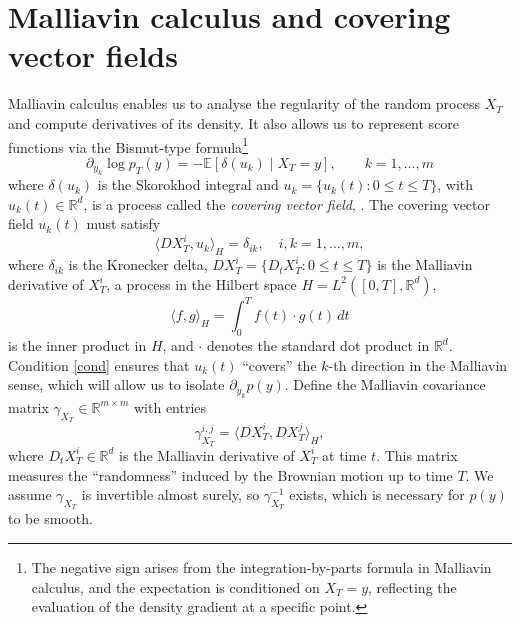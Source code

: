 \documentclass[]{interact}
\newcommand{\E}{\mathbb{E}}
\newcommand{\R}{\mathbb{R}}
\newcommand{\1}{\mathbf{1}}
\theoremstyle{plain}%
\theoremstyle{definition}
\theoremstyle{remark}
\numberwithin{equation}{section}
\begin{document}
\section{Malliavin calculus and covering vector fields}
\label{sec:malliavin}
Malliavin calculus enables us to analyse the regularity of the random process \(X_T\) and compute derivatives of its density. It also allows us to represent score functions via the Bismut-type formula\footnote{The negative sign arises from the integration-by-parts formula in Malliavin calculus, and the expectation is conditioned on \(X_T = y\), reflecting the evaluation of the density gradient at a specific point.}
%
\begin{equation}
\partial_{y_k} \log p_T(y) = -\E \left[ \delta(u_k) \mid X_T = y \right],\qquad k=1,\ldots, m
\end{equation}
where \(\delta(u_k)\) is the Skorokhod integral and \(u_k = \{ u_k(t) : 0 \leq t \leq T \}\), with \(u_k(t) \in \R^d\), 
is a process called the {\em covering vector field}, \cite{malliavin.thalmaier:06:stochastic, Nualart_Nualart_2018}. 
%
The covering vector field  \(u_k(t)\) must satisfy
\begin{equation}
\langle D X_T^i, u_k \rangle_H = \delta_{ik}, \quad i, k = 1, \ldots, m,
\label{cond}
\end{equation}
where  \(\delta_{ik} \) is the Kronecker delta, \(D X_T^i = \{ D_t X_T^i : 0 \leq t \leq T \}\) is the Malliavin derivative of \(X_T^i\), a process in the Hilbert space \(H = L^2\left([0, T], \R^d\right)\), 
\begin{equation*}
\langle f, g \rangle_H = \int_0^T f(t) \cdot g(t) \, dt
\end{equation*}
 is the inner product in \(H\), and \(\cdot\) denotes the standard dot product in \(\R^d\).
%
%
Condition \eqref{cond} ensures that \(u_k(t)\) ``covers'' the \(k\)-th direction 
in the Malliavin sense, which will allow us to isolate \(\partial_{y_k} p(y)\).
%
Define the Malliavin covariance matrix \(\gamma_{X_T} \in \R^{m \times m}\) with entries
\begin{equation}
\gamma_{X_T}^{i,j} = \langle D X_T^i, D X_T^j \rangle_H,
\label{MalliavinCov}
\end{equation}
where \(D_t X_T^i \in \R^d\) is the Malliavin derivative of \(X_T^i\) at time \(t\). This matrix measures the ``randomness'' induced by the Brownian motion up to time \(T\). We assume \(\gamma_{X_T}\) is invertible almost surely, so \(\gamma_{X_T}^{-1}\) exists, which 
is necessary for \(p(y)\) to be smooth.
%
\end{document}
